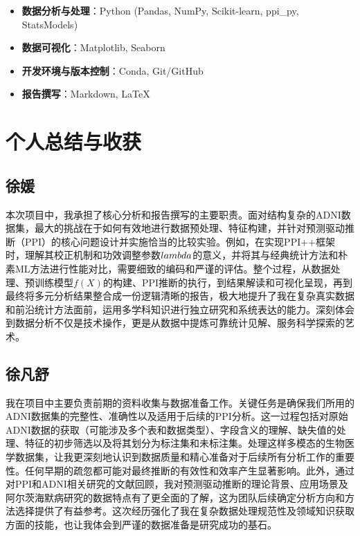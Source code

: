 \documentclass[12pt,a4paper]{article}
\begin{document}
\begin{itemize}
\item \textbf{数据分析与处理}：Python (Pandas, NumPy, Scikit-learn, ppi\_py, StatsModels)
\item \textbf{数据可视化}：Matplotlib, Seaborn
\item \textbf{开发环境与版本控制}：Conda, Git/GitHub
\item \textbf{报告撰写}：Markdown, LaTeX
\end{itemize}


\section{个人总结与收获}
\subsection{徐媛}

\indent 本次项目中，我承担了核心分析和报告撰写的主要职责。面对结构复杂的ADNI数据集，最大的挑战在于如何有效地进行数据预处理、特征构建，并针对预测驱动推断（PPI）的核心问题设计并实施恰当的比较实验。例如，在实现PPI++框架时，理解其校正机制和功效调整参数$\\lambda$的意义，并将其与经典统计方法和朴素ML方法进行性能对比，需要细致的编码和严谨的评估。整个过程，从数据处理、预训练模型$f(X)$的构建、PPI推断的执行，到结果解读和可视化呈现，再到最终将多元分析结果整合成一份逻辑清晰的报告，极大地提升了我在复杂真实数据和前沿统计方法面前，运用多学科知识进行独立研究和系统表达的能力。深刻体会到数据分析不仅是技术操作，更是从数据中提炼可靠统计见解、服务科学探索的艺术。

\subsection{徐凡舒}

\indent 我在项目中主要负责前期的资料收集与数据准备工作。关键任务是确保我们所用的ADNI数据集的完整性、准确性以及适用于后续的PPI分析。这一过程包括对原始ADNI数据的获取（可能涉及多个表和数据类型）、字段含义的理解、缺失值的处理、特征的初步筛选以及将其划分为标注集和未标注集。处理这样多模态的生物医学数据集，让我更深刻地认识到数据质量和精心准备对于后续所有分析工作的重要性。任何早期的疏忽都可能对最终推断的有效性和效率产生显著影响。此外，通过对PPI和ADNI相关研究的文献回顾，我对预测驱动推断的理论背景、应用场景及阿尔茨海默病研究的数据特点有了更全面的了解，这为团队后续确定分析方向和方法选择提供了有益参考。这次经历强化了我在复杂数据处理规范性及领域知识获取方面的技能，也让我体会到严谨的数据准备是研究成功的基石。
\end{document}
